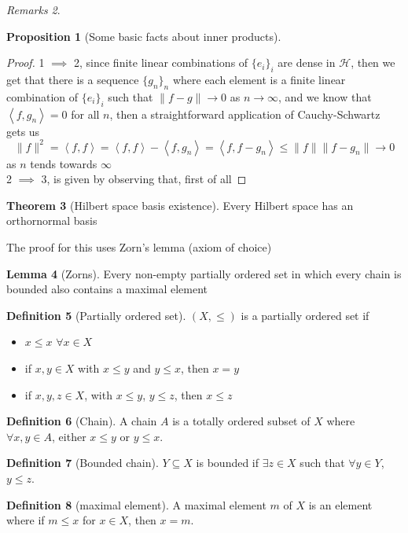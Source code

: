 \documentclass[13pt]{article}
\newcommand{\inprod}[1]{\left\langle #1 \right\rangle}
\theoremstyle{definition} --- default
\newtheorem{theorem}{Theorem}
\newtheorem{proposition}[theorem]{Proposition}
\newtheorem{lemma}[theorem]{Lemma}
\theoremstyle{definition}
\newtheorem{definition}[theorem]{Definition}
\theoremstyle{remark}
\newtheorem{remarks}[theorem]{Remarks}
\begin{document}
\begin{remarks}
\begin{proposition}[Some basic facts about inner products]
\end{proposition}



\begin{proof}
	1 $\implies$ 2, since finite linear combinations of $\{e_i\}_i$ are dense in $\mathcal{H}$, then we get that there is a sequence $\{g_n\}_n$ where each element is a finite linear combination of $\{e_i\}_i$ such that $\|f - g\| \to 0$ as $n \to \infty$, and we know that $\inprod{f,g_n} = 0$ for all $n$, then a straightforward application of Cauchy-Schwartz gets us
	$$
		\|f\|^2 = \inprod{f,f} = \inprod{f,f} - \inprod{f,g_n} = \inprod{f,f-g_n} \leq \|f\|\|f-g_n\| \to 0
	$$
	as $n$ tends towards $\infty$
	\\
	2 $\implies$ 3, is given by observing that, first of all 
\end{proof}
\end{remarks}
\begin{theorem}[Hilbert space basis existence] \label{thm:1}
    Every Hilbert space has an orthornormal basis
\end{theorem}
The proof for this uses Zorn's lemma (axiom of choice)
\begin{lemma}[Zorns]
    Every non-empty partially ordered set in which every chain is bounded also contains a maximal element
\end{lemma}
\begin{definition}[Partially ordered set]
    $(X, \leq)$ is a partially ordered set if 
    \begin{itemize}
        \item $x \leq x$ $\forall x \in X$
        \item if $x,y \in X$ with $x \leq y$ and $y \leq x$, then $x = y$
        \item if $x,y,z \in X$, with $x \leq y$, $y \leq z$, then $x \leq z$
    \end{itemize}
    
\end{definition}

\begin{definition}[Chain]
    A chain $A$ is a totally ordered subset of $X$ where $\forall x,y \in A$, either $x \leq y$ or $y \leq x$. 
\end{definition}
\begin{definition}[Bounded chain]
   $Y \subseteq X$ is bounded if $\exists z \in X$ such that $\forall y \in Y$, $y \leq z$. 
\end{definition}

\begin{definition}[maximal element]
    A maximal element $m$ of $X$ is an element where if $m \leq x$ for $x \in X$, then $x = m$.
\end{definition}
\end{document}
